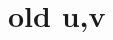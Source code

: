 \documentclass[letterpaper,11pt]{article}
\newcommand{\uset}{\calU}
\newcommand{\usetp}[2]{\uset(#1,#2)}
\newcommand{\vset}{\calV}
\newcommand{\vsetp}[2]{\vset(#1,#2)}
\newcommand{\vstat}{\mathbb{V}}
\begin{document}

\section{old u,v}

    
\end{document}
